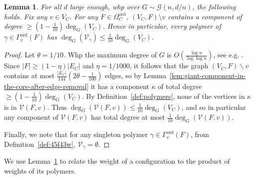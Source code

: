 \documentclass[11pt]{article}
\theoremstyle{plain}
\newtheorem{lemma}[theorem]{Lemma}
\newcommand{\G}{\mathcal{G}}
\newcommand{\V}{\mathcal{V}}
\newcommand{\Vin}{\V_\gamma}
\newcommand{\1}{\mathbb{1}}
\newcommand{\ord}{\mathrm{ord}}
\begin{document}
\begin{lemma}\label{lem:ordered-polymers-are-small}
    For all \(d\) large enough, whp over \(G\sim \G(n,d/n)\), the following holds. Fix any \(v\in V_C\). For any \(F\in\Omega^\ord_C\), \((V_C,F)\setminus v\) contains a component of degree \(\geq (1-\tfrac{1}{10})\deg_G(V_C)\).
    Hence in particular, every polymer of \(\gamma\in\Gamma^\ord_v(F)\) has \(\deg_G(\Vin) \leq \tfrac{1}{10}\deg_G(V_C)\).
\end{lemma}
\begin{proof}
    Let $\theta=1/10$. Whp the maximum degree of \(G\) is \(O(\frac{\log n}{\log\log n})\), see e.g. \cite[Theorem 3.4]{Frieze_Karoński_2015}. Since $|F|\geq (1-\eta)|E_C|$ and $\eta=1/1000$, it follows that the graph $(V_C,F)\backslash v$  contains at most \(\frac{|E_C|}{144}(2\theta  - \tfrac{1}{100})\) edges, so by Lemma~\ref{lem:giant-component-in-the-core-after-edge-removal} it has a component \(\kappa\) of total degree \(\geq (1-\tfrac{1}{10})\deg_G(V_C)\).
    By Definition~\ref{def:polymers},  none of the vertices in $\kappa$ is in \(\V(F,v)\). Thus \(\deg_G(\V(F,v))\leq \tfrac{1}{10}\deg_G(V_C)\), and so in particular any component of \(\V(F,v)\) has total degree at most \(\tfrac{1}{10}\deg_G(\V(F,v))\).

    Finally, we note that for any singleton polymer \(\gamma\in\Gamma^\ord_v(F)\), from  Definition~\ref{def:45f43w}, \(\Vin = \emptyset\).
\end{proof}

We use Lemma~\ref{lem:ordered-polymers-are-small} to relate the weight of a configuration to the product of weights of its polymers.
\end{document}
